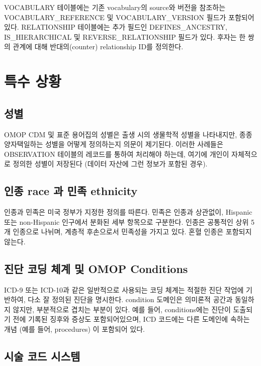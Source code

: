 \documentclass[11pt]{book}
\theoremstyle{definition}
\theoremstyle{definition}
\theoremstyle{definition}
\theoremstyle{remark}
\begin{document}
VOCABULARY 테이블에는 기존 vocabulary의 source와 버전을 참조하는
VOCABULARY\_REFERENCE 및 VOCABULARY\_VERSION 필드가 포함되어 있다.
RELATIONSHIP 테이블에는 추가 필드인 DEFINES\_ANCESTRY, IS\_HIERARCHICAL
및 REVERSE\_RELATIONSHIP 필드가 있다. 후자는 한 쌍의 관계에 대해
반대의(counter) relationship ID를 정의한다.

\section{특수 상황}\label{specialSituations}

\subsection{성별}

OMOP CDM 및 표준 용어집의 성별은 출생 시의 생물학적 성별을 나타내지만,
종종 양자택일하는 성별을 어떻게 정의하는지 의문이 제기된다. 이러한
사례들은 OBSERVATION 테이블의 레코드를 통하여 처리해야 하는데, 여기에
개인이 자체적으로 정의한 성별이 저장된다 (데이터 자산에 그런 정보가
포함된 경우).

\subsection{인종 race 과 민족 ethnicity}\label{-race---ethnicity}

인종과 민족은 미국 정부가 지정한 정의를 따른다. 민족은 인종과 상관없이,
Hispanic 또는 non-Hispanic 인구에서 분화된 세부 항목으로 구분한다.
인종은 공통적인 상위 5개 인종으로 나뉘며, 계층적 후손으로서 민족성을
가지고 있다. 혼혈 인종은 포함되지 않는다.

\subsection{진단 코딩 체계 및 OMOP
Conditions}\label{----omop-conditions}

ICD-9 또는 ICD-10과 같은 일반적으로 사용되는 코딩 체계는 적절한 진단
작업에 기반하여, 다소 잘 정의된 진단을 명시한다. condition 도메인은
의미론적 공간과 동일하지 않지만, 부분적으로 겹치는 부분이 있다. 예를
들어, conditions에는 진단이 도출되기 전에 기록된 징후와 증상도
포함되어있으며, ICD 코드에는 다른 도메인에 속하는 개념 (예를 들어,
procedures) 이 포함되어 있다.

\subsection{시술 코드 시스템}\label{--}
\end{document}
